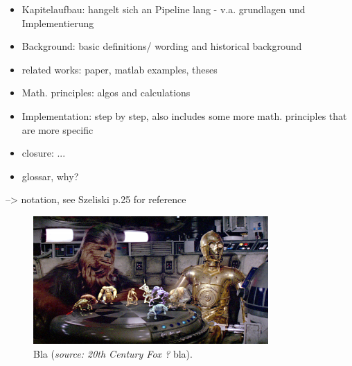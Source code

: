 

\begin{itemize}
\item Kapitelaufbau: hangelt sich an Pipeline lang - v.a. grundlagen und Implementierung
\item Background: basic definitions/ wording and historical background
\item related works: paper, matlab examples, theses
\item Math. principles: algos and calculations
\item Implementation: step by step, also includes some more math. principles that are more specific
\item closure: ...
\item glossar, why?
\end{itemize}

--> notation, see Szeliski p.25 for reference


\begin{figure}[htbp]
		\centering
		\includegraphics[width=0.8\textwidth]{figures/starWars}
		\caption[Bla]{Bla (\textit{source: 20th Century Fox ?} bla).}
		\label{fig:starWars}
\end{figure}

